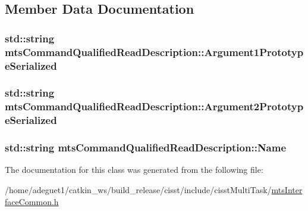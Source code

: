 \subsection{Member Data Documentation}
\hypertarget{classmts_command_qualified_read_description_a3942c33fb00289e328d0b97990e0cadc}{
\subsubsection[{Argument1\-Prototype\-Serialized}]{\setlength{\rightskip}{0pt plus 5cm}std\-::string mts\-Command\-Qualified\-Read\-Description\-::\-Argument1\-Prototype\-Serialized}}\label{classmts_command_qualified_read_description_a3942c33fb00289e328d0b97990e0cadc}
\hypertarget{classmts_command_qualified_read_description_a2695768201660f751e69e3852bb20a6b}{
\subsubsection[{Argument2\-Prototype\-Serialized}]{\setlength{\rightskip}{0pt plus 5cm}std\-::string mts\-Command\-Qualified\-Read\-Description\-::\-Argument2\-Prototype\-Serialized}}\label{classmts_command_qualified_read_description_a2695768201660f751e69e3852bb20a6b}
\hypertarget{classmts_command_qualified_read_description_a9baf176ea04ec6aef288cffbe6fe2c2e}{
\subsubsection[{Name}]{\setlength{\rightskip}{0pt plus 5cm}std\-::string mts\-Command\-Qualified\-Read\-Description\-::\-Name}}\label{classmts_command_qualified_read_description_a9baf176ea04ec6aef288cffbe6fe2c2e}


The documentation for this class was generated from the following file\-:\begin{DoxyCompactItemize}
\item 
/home/adeguet1/catkin\-\_\-ws/build\-\_\-release/cisst/include/cisst\-Multi\-Task/\hyperlink{mts_interface_common_8h}{mts\-Interface\-Common.\-h}\end{DoxyCompactItemize}
